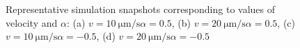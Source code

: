 \documentclass[../../master_thesis_np.tex]{subfiles}
\begin{document}
		\begin{figure}[hbtp]
			\centering\
			\\
			\\
			
			\caption{Representative simulation snapshots corresponding to values of velocity and $\alpha$: (a) $v = \SI{10}{\um \per \second} \alpha = 0.5$, (b) $v = \SI{20}{\um \per \second} \alpha = 0.5$, (c) $v = \SI{10}{\um \per \second} \alpha = -0.5$, (d) $v = \SI{20}{\um \per \second} \alpha = -0.5$}
			\label{fig:lj_velocity_situa}
		\end{figure}
		
\end{document}
